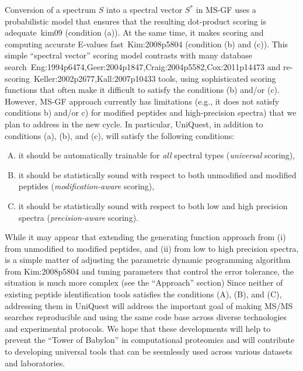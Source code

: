 Conversion of a spectrum $S$ into a spectral vector $S^*$  in MS-GF uses a probabilistic model 
that ensures that the resulting dot-product scoring is adequate~\cite{unv}{kim09} (condition (a)).
At the same time, it makes scoring and computing accurate E-values fast~\cite{unv}{Kim:2008p5804} (condition (b) and (c)).
This simple ``spectral vector'' scoring model contrasts with many database search~\cite{unv}{Eng:1994p6474,Geer:2004p1847,Craig:2004p5582,Cox:2011p14473} and re-scoring~\cite{unv}{Keller:2002p2677,Kall:2007p10433} tools, 
using sophisticated scoring functions that often make it difficult to satisfy the conditions (b) and/or (c).
However, MS-GF approach currently has limitations (e.g., it does not satisfy conditions b) and/or c) for modified peptides and high-precision spectra) that we plan to address in the new cycle. In particular, UniQuest, in addition to conditions (a), (b), and (c), will satisfy the following conditions:  

\begin{enumerate}[(A)]
\item it should be automatically trainable for {\em all} spectral types ({\em universal} scoring),   
\item it should be statistically sound  with respect to both unmodified and modified peptides ({\em modification-aware} scoring),  
\item it should be statistically sound with respect to both low and high precision spectra ({\em precision-aware} scoring).   
\end{enumerate}

While it may appear that extending the generating function approach from  (i)  from unmodified to  modified peptides,   and (ii)  from  low to high precision spectra,  is a simple matter of adjusting the parametric dynamic programming algorithm from \cite{unv}{Kim:2008p5804}  and tuning parameters that control the error tolerance,
the situation is much more complex (see the ``Approach'' section)
Since neither of existing peptide identification tools satisfies the conditions (A), (B), and (C),  addressing them in UniQuest will address the important goal of making MS/MS searches reproducible and using the same code base across diverse technologies and experimental protocols. We hope that these developments will help to prevent the ``Tower of Babylon'' in  computational proteomics and will contribute to developing universal tools that can be seemlessly used across various datasets and laboratories. 







